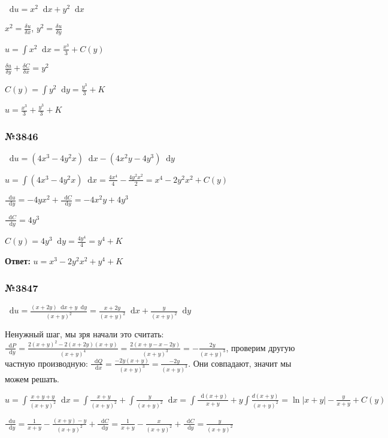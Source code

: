 \documentclass{article}
\newcommand*\diff{\mathop{}\!\mathrm{d}}
\begin{document}
$\diff u = x^2 \diff x + y^2 \diff x$

$x^2 = \frac{\delta u}{\delta x}$, $y^2 = \frac{\delta u}{\delta y}$

$u = \int x^2 \diff x = \frac{x^3}{3} + C(y)$

$\frac{\delta u}{\delta y} + \frac{\delta C}{\delta x} = y^2$

$C(y) = \int y^2 \diff y = \frac{y^3}{3} + K$

$u = \frac{x^3}{3} + \frac{y^3}{3} + K$

\subsubsection{№3846}

$\diff u = (4x^3 - 4y^2 x) \diff x - (4x^2 y - 4y^3) \diff y$

$u = \int (4x^3 - 4y^2 x) \diff x = \frac{4x^4}{4} - \frac{4y^2 x^2}{2} = x^4 - 2y^2 x^2 + C(y)$

$\frac{\diff u}{\diff y} = -4yx^2 + \frac{\diff C}{\diff y} = -4x^2 y + 4y^3$

$\frac{\diff C}{\diff y} = 4y^3$

$C(y) = 4y^3 \diff y = \frac{4y^4}{4} = y^4 + K$

\textbf{Ответ:} $u = x^3 - 2y^2 x^2 + y^4 + K$

\subsubsection{№3847}

$\diff u = \frac{(x + 2y) \diff x + y \diff y}{(x + y)^2} = \frac{x + 2y}{(x+y)^2} \diff x + \frac{y}{(x + y)^2} \diff y$

Ненужный шаг, мы зря начали это считать: $\frac{\diff P}{\diff y} = \frac{2(x + y)^2 - 2(x + 2y)(x + y)}{(x + y)^4} = \frac{2(x + y - x - 2y)}{(x+y)^3} = -\frac{2y}{(x + y)^3}$, проверим другую частную производную: $\frac{\diff Q}{\diff x} = \frac{-2y(x + y)}{(x+y)^3} = \frac{-2y}{(x+y)^3}$. Они совпадают, значит мы можем решать.

$u = \int \frac{x + y + y}{(x+y)^2} \diff x = \int \frac{x + y}{(x + y)^2} + \int \frac{y}{(x + y)^2} \diff x = \int \frac{\diff (x + y)}{x + y} + y \int \frac{d(x + y)}{(x + y)^2} = \ln |x + y| - \frac{y}{x + y} + C(y)$

$\frac{\diff u}{\diff y} = \frac{1}{x + y} - \frac{(x + y) - y}{(x + y)^2} + \frac{\diff C}{\diff y} = \frac{1}{x + y} - \frac{x}{(x + y)^2} + \frac{\diff C}{\diff y} = \frac{y}{(x + y)^2}$
\end{document}
